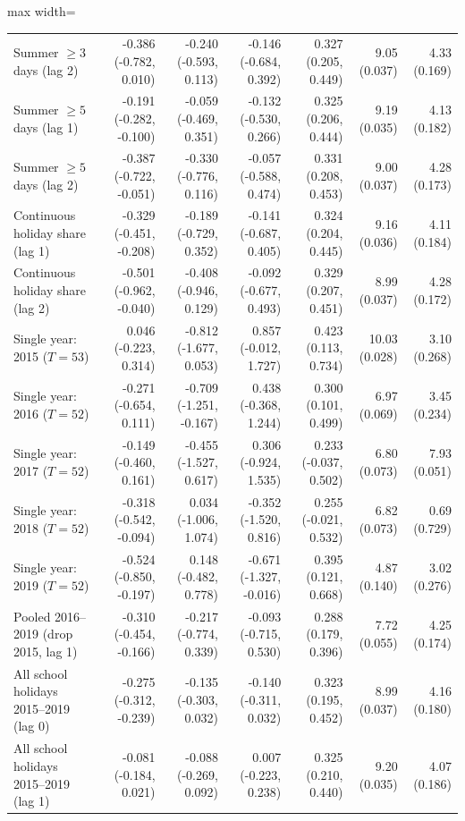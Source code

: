 \begin{table}[!t]
\begin{adjustbox}{max width=\linewidth}
\begin{tabular}{lrrrrrr}
Summer $\ge 3$ days (lag 2) & -0.386 (-0.782, 0.010) & -0.240 (-0.593, 0.113) & -0.146 (-0.684, 0.392) & 0.327 (0.205, 0.449) & 9.05 (0.037) & 4.33 (0.169) \\
Summer $\ge 5$ days (lag 1) & -0.191 (-0.282, -0.100) & -0.059 (-0.469, 0.351) & -0.132 (-0.530, 0.266) & 0.325 (0.206, 0.444) & 9.19 (0.035) & 4.13 (0.182) \\
Summer $\ge 5$ days (lag 2) & -0.387 (-0.722, -0.051) & -0.330 (-0.776, 0.116) & -0.057 (-0.588, 0.474) & 0.331 (0.208, 0.453) & 9.00 (0.037) & 4.28 (0.173) \\
Continuous holiday share (lag 1) & -0.329 (-0.451, -0.208) & -0.189 (-0.729, 0.352) & -0.141 (-0.687, 0.405) & 0.324 (0.204, 0.445) & 9.16 (0.036) & 4.11 (0.184) \\
Continuous holiday share (lag 2) & -0.501 (-0.962, -0.040) & -0.408 (-0.946, 0.129) & -0.092 (-0.677, 0.493) & 0.329 (0.207, 0.451) & 8.99 (0.037) & 4.28 (0.172) \\
Single year: 2015 ($T=53$) & 0.046 (-0.223, 0.314) & -0.812 (-1.677, 0.053) & 0.857 (-0.012, 1.727) & 0.423 (0.113, 0.734) & 10.03 (0.028) & 3.10 (0.268) \\
Single year: 2016 ($T=52$) & -0.271 (-0.654, 0.111) & -0.709 (-1.251, -0.167) & 0.438 (-0.368, 1.244) & 0.300 (0.101, 0.499) & 6.97 (0.069) & 3.45 (0.234) \\
Single year: 2017 ($T=52$) & -0.149 (-0.460, 0.161) & -0.455 (-1.527, 0.617) & 0.306 (-0.924, 1.535) & 0.233 (-0.037, 0.502) & 6.80 (0.073) & 7.93 (0.051) \\
Single year: 2018 ($T=52$) & -0.318 (-0.542, -0.094) & 0.034 (-1.006, 1.074) & -0.352 (-1.520, 0.816) & 0.255 (-0.021, 0.532) & 6.82 (0.073) & 0.69 (0.729) \\
Single year: 2019 ($T=52$) & -0.524 (-0.850, -0.197) & 0.148 (-0.482, 0.778) & -0.671 (-1.327, -0.016) & 0.395 (0.121, 0.668) & 4.87 (0.140) & 3.02 (0.276) \\
Pooled 2016--2019 (drop 2015, lag 1) & -0.310 (-0.454, -0.166) & -0.217 (-0.774, 0.339) & -0.093 (-0.715, 0.530) & 0.288 (0.179, 0.396) & 7.72 (0.055) & 4.25 (0.174) \\
All school holidays 2015--2019 (lag 0) & -0.275 (-0.312, -0.239) & -0.135 (-0.303, 0.032) & -0.140 (-0.311, 0.032) & 0.323 (0.195, 0.452) & 8.99 (0.037) & 4.16 (0.180) \\
All school holidays 2015--2019 (lag 1) & -0.081 (-0.184, 0.021) & -0.088 (-0.269, 0.092) & 0.007 (-0.223, 0.238) & 0.325 (0.210, 0.440) & 9.20 (0.035) & 4.07 (0.186) \\

\end{tabular}
\end{adjustbox}
\end{table}
